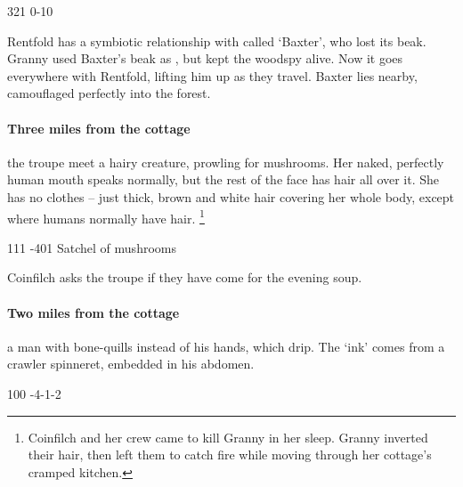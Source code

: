 \documentclass[10pt,twoside]{book}
\begin{document}
%
  {{3}{2}{1}}%
  {{0}{-1}{0}}%
  {%
  }%
  {}%
  {}%
  {\tentacles}%


Rentfold has a symbiotic relationship with  called `Baxter', who lost its beak.
Granny used Baxter's beak as , but kept the \gls{woodspy} alive.
Now it goes everywhere with Rentfold, lifting him up as they travel.
Baxter lies nearby, camouflaged perfectly into the forest.

\paragraph{Three miles from the cottage}
the troupe meet a hairy creature, prowling for mushrooms.
Her naked, perfectly human mouth speaks normally, but the rest of the face has hair all over it.
She has no clothes -- just thick, brown and white hair covering her whole body, except where humans normally have hair.%
\footnote{Coinfilch and her crew came to kill Granny in her sleep.
Granny inverted their hair, then left them to catch fire while moving through her cottage's cramped kitchen.}

%
  {{1}{1}{1}}%
  {{-4}{0}{1}}%
  {%
  }%
  {}%
  {Satchel of mushrooms}%
  {}%

Coinfilch asks the troupe if they have come for the evening soup.

\paragraph{Two miles from the cottage}
a man with bone-quills instead of his hands, which drip.
The `ink' comes from a \gls{crawler} spinneret, embedded in his abdomen.

%
  {{1}{0}{0}}%
  {{-4}{-1}{-2}}%
  {%
  }%
  {}%
  {}%
  {}%
\end{document}
